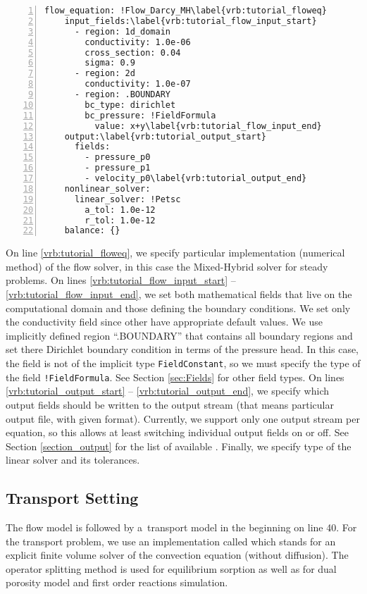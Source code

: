 \begin{Verbatim}[numbers=left, firstnumber=last,commandchars=\\\{\}]
  flow_equation: !Flow_Darcy_MH\label{vrb:tutorial_floweq}
    input_fields:\label{vrb:tutorial_flow_input_start}
      - region: 1d_domain
        conductivity: 1.0e-06
        cross_section: 0.04
        sigma: 0.9
      - region: 2d
        conductivity: 1.0e-07
      - region: .BOUNDARY
        bc_type: dirichlet
        bc_pressure: !FieldFormula
          value: x+y\label{vrb:tutorial_flow_input_end}
    output:\label{vrb:tutorial_output_start}
      fields:
        - pressure_p0
        - pressure_p1
        - velocity_p0\label{vrb:tutorial_output_end}
    nonlinear_solver:
      linear_solver: !Petsc
        a_tol: 1.0e-12
        r_tol: 1.0e-12
    balance: {}
\end{Verbatim}
On line \ref{vrb:tutorial_floweq}, we specify particular implementation (numerical method) of the flow solver, in this case the Mixed-Hybrid
solver for steady problems. On lines \ref{vrb:tutorial_flow_input_start} -- \ref{vrb:tutorial_flow_input_end}, 
we set both mathematical fields that live on the computational domain 
and those defining the boundary conditions. We set only the conductivity field since other 
have appropriate default values.
We use implicitly defined region ``.BOUNDARY'' that contains all boundary regions and set there Dirichlet boundary condition in terms of the 
pressure head. In this case, the field is not of the implicit type {\tt FieldConstant}, so we must specify the type of the field {\tt !FieldFormula}.
See Section \ref{sec:Fields} for other field types. 
On lines \ref{vrb:tutorial_output_start} -- \ref{vrb:tutorial_output_end}, we specify which output fields should be written to the output stream (that means particular output file, with given format).
Currently, we support only one output stream per equation, so this allows at least switching individual output fields on or off. 
See Section \ref{section_output} for the list of available .
Finally, we specify type of the linear solver and its tolerances.



\subsection{Transport Setting}
The flow model is followed by a~transport model in the 
beginning on line 40. For the transport problem, we use an implementation called 
which stands for an explicit finite volume solver of the convection equation (without diffusion).
The operator splitting method is used for equilibrium sorption as well as for dual porosity model and 
first order reactions simulation.

